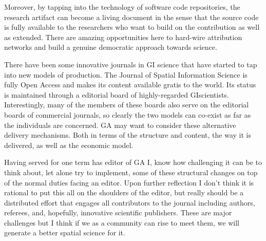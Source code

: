 \documentclass[11pt]{article}
\begin{document}
Moreover, by tapping into the technology of software code repositories, the
research artifact can become a living document in the sense that the source
code is fully available to the researchers who want to build on the
contribution as well as extended. There are amazing opportunities here to
hard-wire attribution networks and build a genuine democratic approach towards
science.

There have been some innovative journals in GI science that have started to tap
into new models of production. The Journal of Spatial Information Science is
fully Open Access and makes its content available gratis to the world. Its
status is maintained through a editorial board of highly-regarded GIscientists.
Interestingly, many of the members of these boards also serve on the editorial
boards of commercial journals, so clearly the two models can co-exist as far as
the individuals are concerned. GA may want to consider these alternative delivery
mechanisms. Both in terms of the structure and content, the way it is delivered,
as well as the economic model.

Having served for one term has editor of GA I, know how challenging it can be
to think about, let alone try to implement, some of these structural changes on
top of the normal duties facing an editor. Upon further reflection I don't think
it is rational to put this all on the shoulders of the editor, but really should
be a distributed effort that engages all contributors to the journal including
authors, referees, and, hopefully, innovative scientific publishers. These are
major challenges but I think if we as a community can rise to meet them, we will
generate a better spatial science for it.



\end{document}
